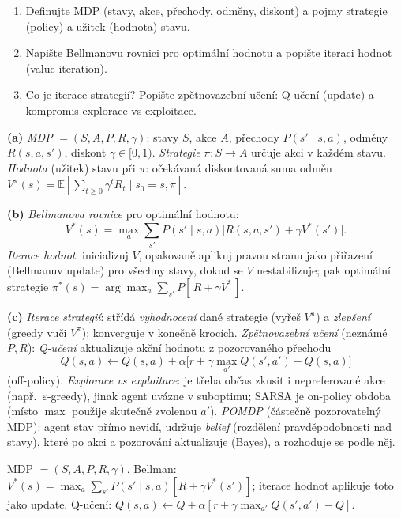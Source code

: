 \begin{zadani}
\begin{enumerate}[label=(\alph*)]
  \item {} Definujte MDP (stavy, akce, přechody, odměny, diskont) a pojmy strategie (policy) a užitek (hodnota) stavu.
  \item {} Napište Bellmanovu rovnici pro optimální hodnotu a popište iteraci hodnot (value iteration).
  \item {} Co je iterace strategií? Popište zpětnovazební učení: Q-učení (update) a kompromis explorace vs exploitace.
\end{enumerate}
\end{zadani}

\begin{reseni}
\textbf{(a)} \emph{MDP} $=(S,A,P,R,\gamma)$: stavy $S$, akce $A$, přechody $P(s'\mid s,a)$, odměny $R(s,a,s')$, diskont $\gamma\in[0,1)$. \emph{Strategie} $\pi:S\to A$ určuje akci v každém stavu. \emph{Hodnota} (užitek) stavu při $\pi$: očekávaná diskontovaná suma odměn $V^\pi(s)=\mathbb{E}[\sum_{t\ge0}\gamma^t R_t\mid s_0=s,\pi]$.

\textbf{(b)} \emph{Bellmanova rovnice} pro optimální hodnotu:
\[
V^*(s)=\max_{a}\sum_{s'}P(s'\mid s,a)\big[R(s,a,s')+\gamma V^*(s')\big].
\]
\emph{Iterace hodnot}: inicializuj $V$, opakovaně aplikuj pravou stranu jako přiřazení (Bellmanuv update) pro všechny stavy, dokud se $V$ nestabilizuje; pak optimální strategie $\pi^*(s)=\arg\max_a\sum_{s'}P[\,R+\gamma V^*\,]$.

\textbf{(c)} \emph{Iterace strategií}: střídá \emph{vyhodnocení} dané strategie (vyřeš $V^\pi$) a \emph{zlepšení} (greedy vuči $V^\pi$); konverguje v konečně krocích. \emph{Zpětnovazební učení} (neznámé $P,R$): \emph{Q-učení} aktualizuje akční hodnotu z pozorovaného přechodu
\[
Q(s,a)\leftarrow Q(s,a)+\alpha\big[r+\gamma\max_{a'}Q(s',a')-Q(s,a)\big]
\]
(off-policy). \emph{Explorace vs exploitace}: je třeba občas zkusit i nepreferované akce (např.\ $\varepsilon$-greedy), jinak agent uvázne v suboptimu; SARSA je on-policy obdoba (místo $\max$ použije skutečně zvolenou $a'$). \emph{POMDP} (částečně pozorovatelný MDP): agent stav přímo nevidí, udržuje \emph{belief} (rozdělení pravděpodobnosti nad stavy), které po akci a pozorování aktualizuje (Bayes), a rozhoduje se podle něj.
\end{reseni}

\begin{jadro}
MDP $=(S,A,P,R,\gamma)$. Bellman: $V^*(s)=\max_a\sum_{s'}P(s'\!\mid\!s,a)[R+\gamma V^*(s')]$; iterace hodnot aplikuje toto jako update. Q-učení: $Q(s,a)\leftarrow Q+\alpha[r+\gamma\max_{a'}Q(s',a')-Q]$.
\end{jadro}

